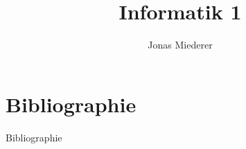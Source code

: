 \documentclass[xcolor=table, 9pt]{beamer}
\title{Informatik 1}
\author{Jonas Miederer}
\institute{DHBW Stuttgart - Campus Horb}
\begin{document}

%
%
%
%
%
%
%
%

%
%

 \section{Bibliographie}
        \begin{frame}[allowframebreaks]{Bibliographie}
            \printbibliography
\end{frame}
\end{document}
